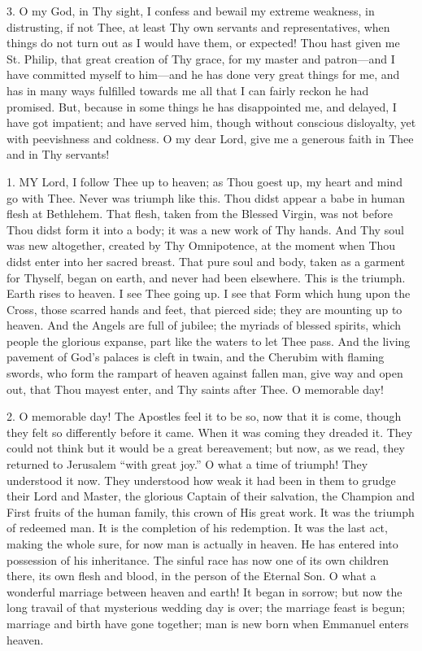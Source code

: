 3. O my God, in Thy sight, I
confess and bewail my extreme weakness, in distrusting, if not Thee, at
least Thy own servants and representatives, when things do not turn out
as I would have them, or expected! Thou hast given me St. Philip,
that great creation of Thy grace, for my master and patron—and I have
committed myself to him—and he has done very great things for me, and
has in many ways fulfilled towards me all that I can fairly reckon he
had promised. But, because in some things he has disappointed me, and
delayed, I have got impatient; and have served him, though without
conscious disloyalty, yet with peevishness and coldness. O my dear Lord,
give me a generous faith in Thee and in Thy servants!



1. MY
Lord, I follow Thee up to heaven; as Thou goest up, my heart and mind go
with Thee. Never was triumph like this. Thou didst appear a babe in
human flesh at Bethlehem. That flesh, taken from the Blessed Virgin, was
not before Thou didst form it into a body; it was a new work of Thy
hands. And Thy soul was new altogether, created by Thy Omnipotence, at
the moment when Thou didst enter into her sacred breast. That pure soul
and body, taken as a garment for Thyself, began on earth, and never had
been elsewhere. This is the triumph. Earth rises to heaven. I see Thee
going up. I see that Form which hung upon the Cross, those scarred hands
and feet, that pierced side; they are mounting up to heaven. And the
Angels are full of jubilee; the myriads of blessed spirits, which people
the glorious expanse, part like the waters to let Thee pass. And the
living pavement of God's palaces is cleft in twain, and the Cherubim
with flaming swords, who form the rampart of heaven against fallen
man, give way and open out, that Thou mayest enter, and Thy saints after
Thee. O memorable day!

2. O memorable day! The Apostles
feel it to be so, now that it is come, though they felt so differently
before it came. When it was coming they dreaded it. They could not think
but it would be a great bereavement; but now, as we read, they returned
to Jerusalem ``with great joy.'' O what a time of triumph! They understood
it now. They understood how weak it had been in them to grudge their
Lord and Master, the glorious Captain of their salvation, the Champion
and First fruits of the human family, this crown of His great work. It
was the triumph of redeemed man. It is the completion of his redemption.
It was the last act, making the whole sure, for now man is actually in
heaven. He has entered into possession of his inheritance. The sinful
race has now one of its own children there, its own flesh and blood, in
the person of the Eternal Son. O what a wonderful marriage between
heaven and earth! It began in sorrow; but now the long travail of that
mysterious wedding day is over; the marriage feast is begun; marriage
and birth have gone together; man is new born when Emmanuel enters
heaven.

